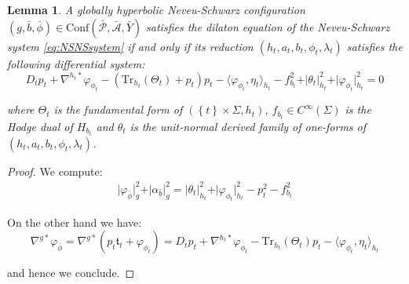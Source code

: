 \documentclass[10pt,reqno,a4paper]{amsart}
\theoremstyle{plain}
\newtheorem{lemma}[thm]{Lemma}
\theoremstyle{definition}
\theoremstyle{remark}
\theoremstyle{remark}
\def\Conf{\mathrm{Conf}}
\newcommand{\Tr}{\mathrm{Tr}}
\def\cA{\mathcal{A}}
\def\cP{\mathcal{P}}
\renewcommand{\(}{ (}
\renewcommand{\)}{ )}
\begin{document}
\begin{lemma}
\label{lemma:Dilatongh}
A globally hyperbolic Neveu-Schwarz configuration $(g,\bar{b},\bar{\phi})\in \Conf(\bar{\cP},\bar{\cA},\bar{Y})$ satisfies the dilaton equation of the Neveu-Schwarz system \eqref{eq:NSNSsystem} if and only if its reduction $( h_t , a_t , b_t , \phi_t,\lambda_t)$ satisfies the following differential system:
\begin{equation*}
D_tp_t + \nabla^{h_t\ast}\varphi_{\phi_t}  - (\Tr_{h_t}(\Theta_t) + p_t) p_t-\langle\varphi_{\phi_t},\eta_t\rangle_{h_t} - f_{b_t}^2 + \vert \theta_t \vert_{h_t}^2 + \vert \varphi_{\phi_t} \vert_{h_t}^2 = 0
\end{equation*}
 
\noindent
where $\Theta_t$ is the fundamental form of $(\left\{ t\right\} \times \Sigma, h_t)$, $f_{b_t}\in C^{\infty}(\Sigma)$ is the Hodge dual of $H_{b_t}$ and $\theta_t$ is the unit-normal derived family of one-forms of $( h_t , a_t , b_t , \phi_t,\lambda_t)$. 
\end{lemma}

\begin{proof}
We compute:
\begin{eqnarray*}
\vert \varphi_{\bar{\phi}}\vert_g^2 + \vert\alpha_{\bar{b}}\vert^2_g =  \vert \theta_t \vert_{h_t}^2 + \vert \varphi_{\phi_t} \vert_{h_t}^2 - p_t^2 - f_{b_t}^2 
\end{eqnarray*}

\noindent
On the other hand we have:
\begin{equation*}
\nabla^{g\ast}\varphi_{\bar{\phi}}  = \nabla^{g\ast}(p_t\mathfrak{t}_t + \varphi_{\phi_t}) = D_tp_t + \nabla^{h_t\ast}\varphi_{\phi_t}-\Tr_{h_t}(\Theta_t)p_t-\langle\varphi_{\phi_t},\eta_t\rangle_{h_t}
\end{equation*}

\noindent
and hence  we conclude.
\end{proof}
\end{document}
